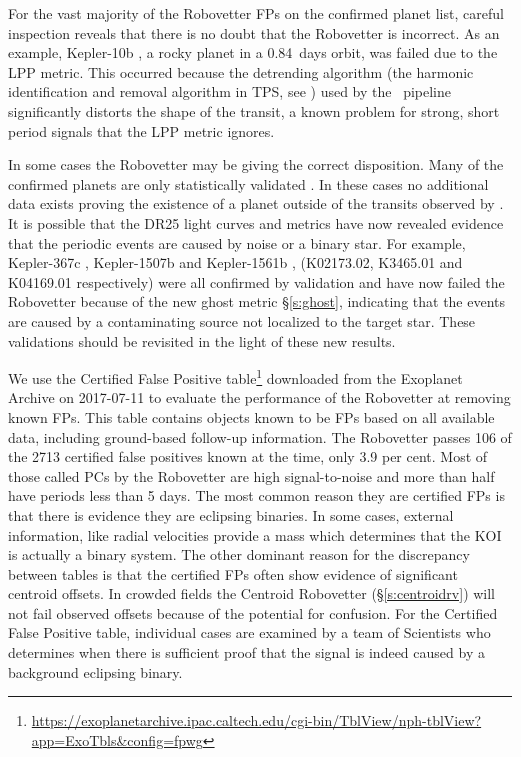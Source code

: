 For the vast majority of the Robovetter FPs on the confirmed planet list, careful inspection reveals that there is no doubt that the Robovetter is incorrect. As an example, Kepler-10b \citep[][]{Batalha2011Kepler10,Fogtmann2014Kepler10}, a rocky planet in a 0.84~days orbit, was failed due to the LPP metric. This occurred because the detrending algorithm (the harmonic identification and removal algorithm in TPS, see \citet{JenkinsKDPH}) used by the \Kepler\ pipeline significantly distorts the shape of the transit, a known problem for strong, short period signals \citep{Christiansen2015} that the LPP metric ignores. 

In some cases the Robovetter may be giving the correct disposition.  Many of the confirmed planets are only statistically validated \citep{Morton2016,Rowe2014}. In these cases no additional data exists proving the existence of a planet outside of the transits observed by \Kepler. It is possible that the DR25 light curves and metrics have now revealed evidence that the periodic events are caused by noise or a binary star. For example, Kepler-367c \citep{Rowe2014}, Kepler-1507b \citep{Morton2016} and Kepler-1561b \citep{Morton2016}, (K02173.02, K3465.01 and K04169.01 respectively) were all confirmed by validation and have now failed the Robovetter because of the new ghost metric \S\ref{s:ghost}, indicating that the events are caused by a contaminating source not localized to the target star.  These validations should be revisited in the light of these new results.


We use the Certified False Positive table\footnote{\url{https://exoplanetarchive.ipac.caltech.edu/cgi-bin/TblView/nph-tblView?app=ExoTbls\&config=fpwg}} downloaded from the Exoplanet Archive on 2017-07-11 to evaluate the performance of the Robovetter at removing known FPs. This table contains objects known to be FPs based on all available data, including ground-based follow-up information.  The Robovetter passes 106 of the 2713 certified false positives known at the time, only 3.9 per cent.  Most of those called PCs by the Robovetter are high signal-to-noise and more than half have periods less than 5 days.  The most common reason they are certified FPs is that there is evidence they are eclipsing binaries. In some cases, external information, like radial velocities provide a mass which determines that the KOI is actually a binary system. The other dominant reason for the discrepancy between tables is that the certified FPs often show evidence of significant centroid offsets. In crowded fields the Centroid Robovetter (\S\ref{s:centroidrv}) will not fail observed offsets because of the potential for confusion. For the Certified False Positive table, individual cases are examined by a team of Scientists who determines when there is sufficient proof that the signal is indeed caused by a background eclipsing binary.  

